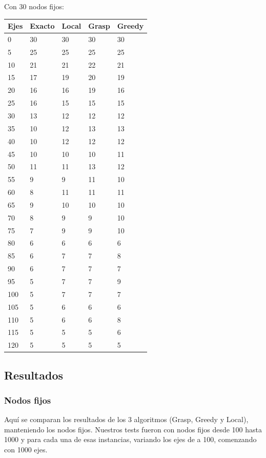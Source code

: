 Con 30 nodos fijos:\\
\begin{tabular}{| l | l | l | l | l |}
 \hline
Ejes&Exacto&Local&Grasp&Greedy \\ \hline
0&30&30&30&30 \\ \hline
5&25&25&25&25 \\ \hline
10&21&21&22&21 \\ \hline
15&17&19&20&19 \\ \hline
20&16&16&19&16 \\ \hline
25&16&15&15&15 \\ \hline
30&13&12&12&12 \\ \hline
35&10&12&13&13 \\ \hline
40&10&12&12&12 \\ \hline
45&10&10&10&11 \\ \hline
50&11&11&13&12 \\ \hline
55&9&9&11&10 \\ \hline
60&8&11&11&11 \\ \hline
65&9&10&10&10 \\ \hline
70&8&9&9&10 \\ \hline
75&7&9&9&10 \\ \hline
80&6&6&6&6 \\ \hline
85&6&7&7&8 \\ \hline
90&6&7&7&7 \\ \hline
95&5&7&7&9 \\ \hline
100&5&7&7&7 \\ \hline
105&5&6&6&6 \\ \hline
110&5&6&6&8 \\ \hline
115&5&5&5&6 \\ \hline
120&5&5&5&5 \\ \hline
\end{tabular}





\subsection{Resultados}
\subsubsection{Nodos fijos}
Aqu\'i se comparan los resultados de los 3 algoritmos (Grasp, Greedy y Local), manteniendo los nodos fijos. Nuestros tests fueron con nodos fijos desde 100 hasta 1000 y para cada una de esas instancias,
variando los ejes de a 100, comenzando con 1000 ejes.\\

